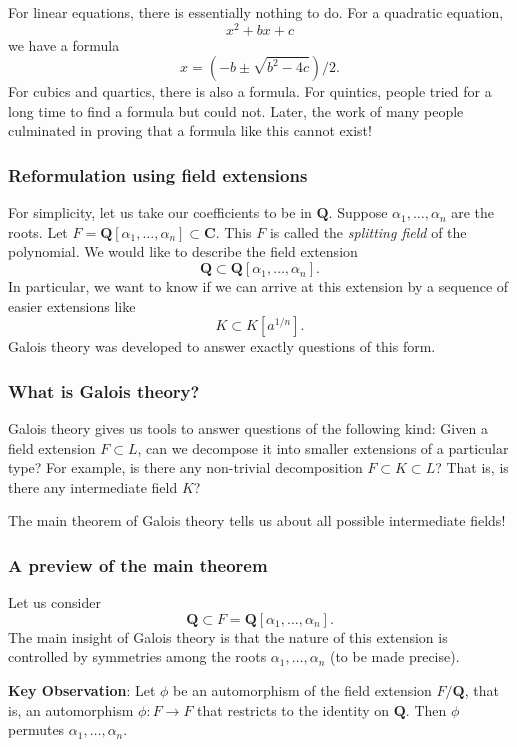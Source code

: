 \documentclass[11pt]{article}
\begin{document}
For linear equations, there is essentially nothing to do.
For a quadratic equation,
\[ x^2 + bx + c\]
we have a formula
\[ x = (-b \pm \sqrt{b^2-4c})/2.\]
For cubics and quartics, there is also a formula.
For quintics, people tried for a long time to find a formula but could not.
Later, the work of many people culminated in proving that a formula like this cannot exist!
\subsubsection{Reformulation using field extensions}
\label{sec:orge69f482}
For simplicity, let us take our coefficients to be in \(\mathbf{Q}\).
Suppose \(\alpha_1, \dots, \alpha_n\) are the roots.
Let \(F = \mathbf{Q}[\alpha_1, \dots, \alpha_n] \subset \mathbf{C}\).
This \(F\) is called the \emph{splitting field} of the polynomial.
We would like to describe the field extension
\[ \mathbf{Q} \subset \mathbf{Q}[\alpha_1, \dots, \alpha_n].\] 
In particular, we want to know if we can arrive at this extension by a sequence of easier extensions like
\[ K \subset K[a^{1/n}].\]
Galois theory was developed to answer exactly questions of this form.
\subsubsection{What is Galois theory?}
\label{sec:org542a084}
Galois theory gives us tools to answer questions of the following kind:
Given a field extension \(F \subset L\), can we decompose it into smaller extensions of a particular type?
For example, is there any non-trivial decomposition \(F \subset K \subset L\)?
That is, is there any intermediate field \(K\)?

The main theorem of Galois theory tells us about all possible intermediate fields!
\subsubsection{A preview of the main theorem}
\label{sec:org77293eb}
Let us consider
\[ \mathbf{Q} \subset F = \mathbf{Q}[\alpha_1, \dots, \alpha_{n}].\]
The main insight of Galois theory is that the nature of this extension is controlled by symmetries among the roots \(\alpha_{1}, \dots, \alpha_n\) (to be made precise).

\textbf{\textbf{Key Observation}}: Let \(\phi\) be an automorphism of the field extension \(F / \mathbf{Q}\), that is, an automorphism \(\phi \colon F \to F\) that restricts to the identity on \(\mathbf{Q}\).
Then \(\phi\) permutes \(\alpha_1, \dots, \alpha_n\).
\end{document}
